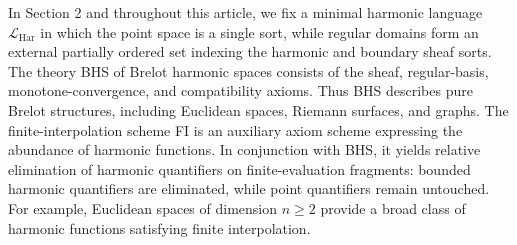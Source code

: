 \documentclass{amsart}
\theoremstyle{definition}
\theoremstyle{remark}
\numberwithin{equation}{section}
\begin{document}
	
	
	In Section 2 and throughout this article, we fix a minimal harmonic language $\mathcal L_{\mathrm{Har}}$ in which the point space is a single sort, while regular domains form an external partially ordered set indexing the harmonic and boundary sheaf sorts. %
	The theory BHS of Brelot harmonic spaces consists of the sheaf, regular-basis, monotone-convergence, and compatibility axioms. Thus BHS describes pure Brelot structures, including Euclidean spaces, Riemann surfaces, and graphs. %
	The finite-interpolation scheme FI is an auxiliary axiom scheme expressing the abundance of harmonic functions. In conjunction with BHS, it yields relative elimination of harmonic quantifiers on finite-evaluation fragments: bounded harmonic quantifiers are eliminated, while point quantifiers remain untouched. For example, Euclidean spaces of dimension $n\ge2$ provide a broad class of harmonic functions satisfying finite interpolation.
	
\end{document}
